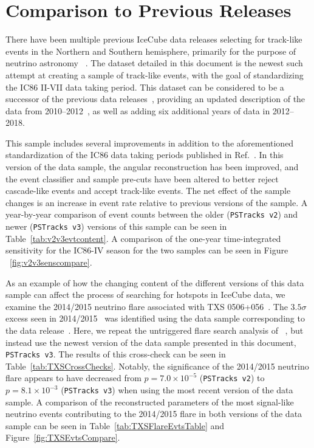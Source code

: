 \documentclass[aps,10pt,prd,twocolumn,floats,letterpaper,showpacs,nofootinbib,bibnotes,notitlepage,superscriptaddress,floatfix]{revtex4-1}
\newcommand{\MA}[1]{{\color{black}#1}}
\begin{document}
\section{Comparison to Previous Releases}\label{secIV}

There have been multiple previous IceCube data releases selecting for track-like events in the Northern and Southern hemisphere, primarily for the purpose of neutrino astronomy ~\cite{Abbasi:2010rd,Aartsen:2013uuv,IceCube:2018,IceCube:2019,IceCube:TXS2018}. The dataset detailed in this document is the newest such attempt at creating a sample of track-like events, with the goal of standardizing the IC86 II-VII data taking period. This dataset can be considered to be a successor of the previous data releases~\cite{IC40data,IC59data,IceCube:2018}, providing an updated description of the data from 2010--2012~\cite{IceCube:2018}, as well as adding six additional years of data in 2012--2018. 

This sample includes several improvements in addition to the aforementioned standardization of the IC86 data taking periods published in Ref.~\cite{IceCube:2018}. In this version of the data sample, the angular reconstruction has been improved, and the event classifier and sample pre-cuts have been altered to better reject cascade-like events and accept track-like events. The net effect of the sample changes is an increase in event rate relative to previous versions of the sample. A year-by-year comparison of event counts between the older \MA{({\tt PSTracks v2})} and newer \MA{({\tt PSTracks v3})} versions of this sample can be seen in Table~\ref{tab:v2v3evtcontent}. A comparison of the one-year time-integrated sensitivity for the IC86-IV season for the two samples can be seen in Figure ~\ref{fig:v2v3senscompare}. 

As an example of how the changing content of the different versions of this data sample can affect the process of searching for hotspots in IceCube data, we examine the 2014/2015 neutrino flare associated with TXS 0506+056~\cite{IceCube:2018cha}. The $3.5 \sigma$ excess seen in 2014/2015~\cite{IceCube:2018cha} was identified using the data sample corresponding to the data release~\cite{IceCube:2019}. Here, we repeat the untriggered flare search analysis of ~\cite{IceCube:2018cha}, but instead use the newest version of the data sample presented in this document, {\tt PSTracks v3}. The results of this cross-check can be seen in Table~\ref{tab:TXSCrossChecks}. Notably, the significance of the 2014/2015 neutrino flare appears to have decreased from $p=7.0 \times 10^{-5}$ ({\tt PSTracks v2}) to $p=8.1 \times 10^{-3}$ ({\tt PSTracks v3}) when using the most recent version of the data sample. A comparison of the reconstructed parameters of the most signal-like neutrino events contributing to the 2014/2015 flare in both versions of the data sample can be seen in Table~\ref{tab:TXSFlareEvtsTable} and Figure~\ref{fig:TXSEvtsCompare}.
\end{document}
